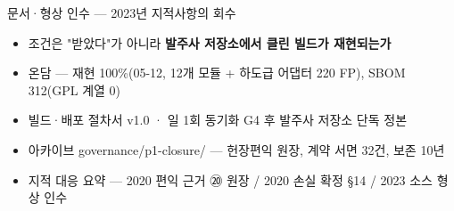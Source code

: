 \begin{frame}{문서·형상 인수 — 2023년 지적사항의 회수}
\begin{itemize}
\item 조건은 "받았다"가 아니라 \textbf{발주사 저장소에서 클린 빌드가 재현되는가}
\item 온담 — 재현 100\%(05-12, 12개 모듈 + 하도급 어댑터 220 FP), SBOM 312(GPL 계열 0)
\item 빌드·배포 절차서 v1.0 · 일 1회 동기화 \ra{} G4 후 발주사 저장소 단독 정본
\item 아카이브 \textsf{governance/p1-closure/} — 헌장\til{}편익 원장, 계약 서면 32건, 보존 10년
\item 지적 대응 요약 — 2020 편익 근거 \ra{} ⑳ 원장 / 2020 손실 확정 \ra{} §14 / 2023 소스 \ra{} 형상 인수
\end{itemize}
\end{frame}

